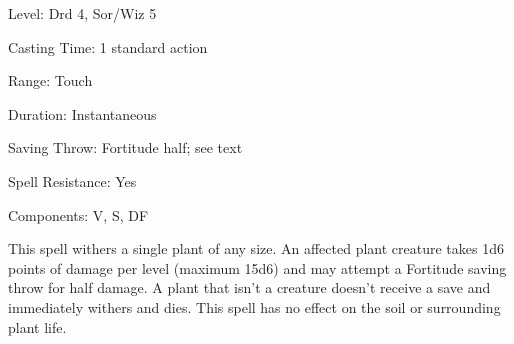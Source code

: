 
\begin{description*}
\item[Level:] Drd 4, Sor/Wiz 5
\item[Casting Time:] 1 standard action
\item[Range:] Touch
\item[Duration:] Instantaneous
\item[Saving Throw:] Fortitude half; see text
\item[Spell Resistance:] Yes
\item[Components:] V, S, DF
\end{description*}

This spell withers a single plant of any size. An affected plant creature takes
1d6 points of damage per level (maximum 15d6) and may attempt a Fortitude saving
throw for half damage. A plant that isn't a creature doesn't receive a save and
immediately withers and dies.
This spell has no effect on the soil or surrounding plant life.
